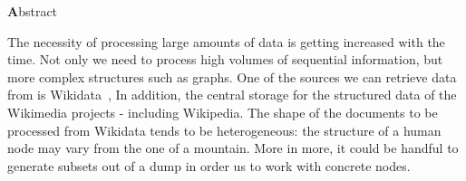 \thispagestyle{empty}

\vspace*{\fill}

\begin{center}
	\large
	{\textbf Abstract}\\[5mm]
\end{center}
The necessity of processing large amounts of data is getting increased with the time. Not only we need to process high volumes of sequential information, but more complex structures such as graphs. One of the sources we can retrieve data from is Wikidata~\cite{web:wikidata},  In addition, the central storage for the structured data of the Wikimedia projects - including Wikipedia. The shape of the documents to be processed from Wikidata tends to be heterogeneous: the structure of a human node may vary from the one of a mountain. More in more, it could be handful to generate subsets out of a dump in order us to work with concrete nodes.

\vspace*{\fill}